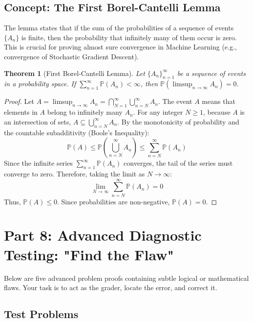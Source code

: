 \documentclass[11pt]{article}
\newtheorem{theorem}{Theorem}[section]
\theoremstyle{definition}
\theoremstyle{remark}
\newcommand{\Prob}{\mathbb{P}}
\begin{document}
\subsection{Concept: The First Borel-Cantelli Lemma}
The lemma states that if the sum of the probabilities of a sequence of events $\{A_n\}$ is finite, then the probability that infinitely many of them occur is zero. This is crucial for proving almost sure convergence in Machine Learning (e.g., convergence of Stochastic Gradient Descent).

\begin{theorem}[First Borel-Cantelli Lemma]
Let $\{A_n\}_{n=1}^{\infty}$ be a sequence of events in a probability space. If $\sum_{n=1}^{\infty} \Prob(A_n) < \infty$, then $\Prob\left( \limsup_{n \to \infty} A_n \right) = 0$.
\end{theorem}

\begin{proof}
Let $A = \limsup_{n \to \infty} A_n = \bigcap_{N=1}^{\infty} \bigcup_{n=N}^{\infty} A_n$.
The event $A$ means that elements in $A$ belong to infinitely many $A_n$.
For any integer $N \ge 1$, because $A$ is an intersection of sets, $A \subseteq \bigcup_{n=N}^{\infty} A_n$.
By the monotonicity of probability and the countable subadditivity (Boole's Inequality):
\[ \Prob(A) \le \Prob\left( \bigcup_{n=N}^{\infty} A_n \right) \le \sum_{n=N}^{\infty} \Prob(A_n) \]
Since the infinite series $\sum_{n=1}^{\infty} \Prob(A_n)$ converges, the tail of the series must converge to zero. Therefore, taking the limit as $N \to \infty$:
\[ \lim_{N \to \infty} \sum_{n=N}^{\infty} \Prob(A_n) = 0 \]
Thus, $\Prob(A) \le 0$. Since probabilities are non-negative, $\Prob(A) = 0$. 
\end{proof}

\newpage
\section{Part 8: Advanced Diagnostic Testing: "Find the Flaw"}

Below are five advanced problem proofs containing subtle logical or mathematical flaws. Your task is to act as the grader, locate the error, and correct it.

\subsection{Test Problems}
\end{document}
